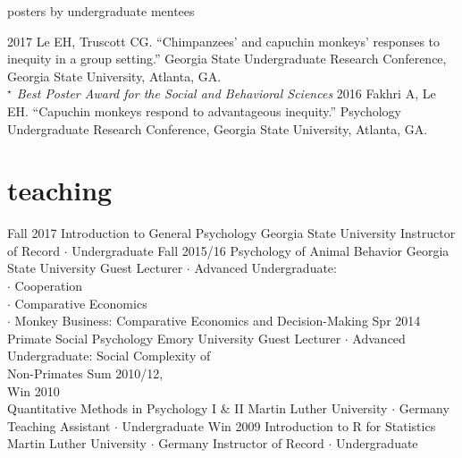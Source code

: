 \documentclass[]{friggeri-cv}
\begin{document}

{\subfont\large{} posters by undergraduate mentees}

\begin{entrylist2}
  \entrytwo
    {2017}
    {Le EH, Truscott CG. ``Chimpanzees' and capuchin monkeys' responses to inequity in a group setting.'' Georgia State Undergraduate Research Conference, Georgia State University, Atlanta, GA.\\
    \emph{${}^\star$ Best Poster Award for the Social and Behavioral Sciences}}
  \entrytwo
    {2016}
    {Fakhri A, Le EH. ``Capuchin monkeys respond to advantageous inequity.'' Psychology Undergraduate Research Conference, Georgia State University, Atlanta, GA.}
\end{entrylist2}



\section{teaching}

\begin{entrylist}
  \entry
    {Fall 2017}
    {Introduction to General Psychology}
    {Georgia State University}
    {Instructor of Record $\cdot$ Undergraduate}
  \entry
    {Fall 2015/16}
    {Psychology of Animal Behavior}
    {Georgia State University}
    {Guest Lecturer $\cdot$ Advanced Undergraduate:\\ 
    $\cdot$ Cooperation\\
    $\cdot$ Comparative Economics\\
    $\cdot$ Monkey Business: Comparative Economics and Decision-Making}
  \entry
    {Spr 2014}
    {Primate Social Psychology}
    {Emory University}
    {Guest Lecturer $\cdot$ Advanced Undergraduate: Social Complexity of\\ Non-Primates}
  \entry
    {Sum 2010/12,\\Win 2010\\[-.85cm]}
    {Quantitative Methods in Psychology I \& II}
    {Martin Luther University $\cdot$ Germany}
    {Teaching Assistant $\cdot$ Undergraduate}
  \entry
    {Win 2009}
    {Introduction to R for Statistics}
    {Martin Luther University $\cdot$ Germany}
    {Instructor of Record $\cdot$ Undergraduate}
\end{entrylist}
\end{document}
